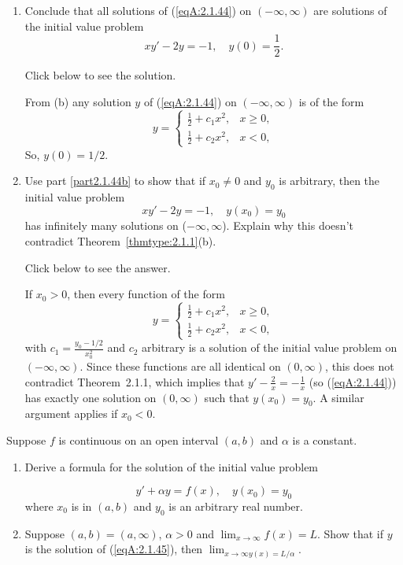 \documentclass{ximera}
\begin{document}
\begin{problem}
\begin{enumerate}
\item %
Conclude that all solutions of (\ref{eqA:2.1.44}) on
$(-\infty,\infty)$ are solutions of the initial value problem
$$
xy'-2y=-1,\quad y(0)=\frac{1}{2}.
$$

Click below to see the solution.

\begin{expandable}
    From (b) any solution $y$ of (\ref{eqA:2.1.44}) on
$(-\infty,\infty)$ is of the form
$$
y=\left\{\begin{array}{ll}\frac{1}{2}+c_1x^2, &x
\ge 0,\\
\frac{1}{2}+c_2x^2, &x < 0,\end{array}\right.
$$
So,
$y(0)=1/2$.
\end{expandable}

\item %
Use part \ref{part2.1.44b} to show that if  $x_0\neq 0$ and $y_0$  is arbitrary, then
  the  initial value problem
$$
xy'-2y=-1,\quad y(x_0)=y_0
$$
has infinitely many solutions on ($-\infty,\infty$). Explain why this
doesn't contradict  Theorem~\ref{thmtype:2.1.1}(b).

Click below to see the answer.

\begin{expandable}
    If $x_0>0$, then every function of the form
$$
y=\left\{\begin{array}{ll}\frac{1}{2}+c_1x^2, &x
\ge 0,\\
\frac{1}{2}+c_2x^2, &x < 0,\end{array}\right.
$$
with $c_1=\frac{y_0-1/2}{x_0^2}$ and $c_2$
arbitrary is a solution of the initial value problem on
$(-\infty,\infty)$. Since these functions are all identical on
$(0,\infty)$, this does not contradict Theorem~2.1.1, which
implies that 
$y'-\frac{2}{x}=-\frac{1}{x}$ (so
(\ref{eqA:2.1.44})) has exactly one solution on $(0,\infty)$ such
that $y(x_0)=y_0$. A similar argument applies if $x_0<0$.
\end{expandable}
\end{enumerate}
\end{problem}

\begin{problem}\label{exer:2.1.45}
Suppose $f$ is continuous on an open interval $(a,b)$
and $\alpha$ is a constant.
\begin{enumerate}
\item %
Derive a formula for the solution of the initial value
problem

\begin{equation}\label{eqA:2.1.45}
y'+\alpha y=f(x),\quad y(x_0)=y_0
\end{equation}
where $x_0$ is in $(a,b)$ and $y_0$ is an arbitrary real number.

\item %
Suppose $(a,b)=(a,\infty)$, $\alpha > 0$ and
$\lim_{x\to\infty} f(x)=L$. Show that if $y$ is the
solution of (\ref{eqA:2.1.45}), then $\lim_{x\to
\infty y(x)=L/\alpha}$.
\end{enumerate}
\end{problem}
\end{document}
